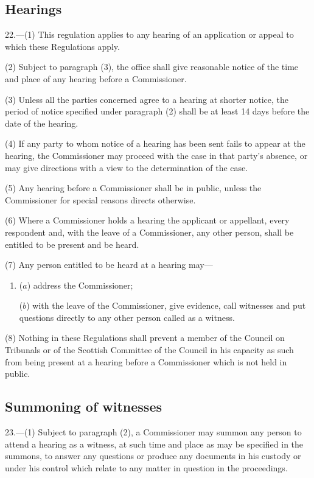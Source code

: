 \documentclass[12pt,a4paper]{article}
\begin{document}
\subsection[22. Hearings]{Hearings}

22.—(1) This regulation applies to any hearing of an application or appeal to which these Regulations apply.

(2) Subject to paragraph (3), the office shall give reasonable notice of the time and place of any hearing before a Commissioner.

(3) Unless all the parties concerned agree to a hearing at shorter notice, the period of notice specified under paragraph (2) shall be at least 14 days before the date of the hearing.

(4) If any party to whom notice of a hearing has been sent fails to appear at the hearing, the Commissioner may proceed with the case in that party’s absence, or may give directions with a view to the determination of the case.

(5) Any hearing before a Commissioner shall be in public, unless the Commissioner for special reasons directs otherwise.

(6) Where a Commissioner holds a hearing the applicant or appellant, every respondent and, with the leave of a Commissioner, any other person, shall be entitled to be present and be heard.

(7) Any person entitled to be heard at a hearing may---
\begin{enumerate}\item[]
($a$) address the Commissioner;

($b$) with the leave of the Commissioner, give evidence, call witnesses and put questions directly to any other person called as a witness.
\end{enumerate}

(8) Nothing in these Regulations shall prevent a member of the Council on Tribunals or of the Scottish Committee of the Council in his capacity as such from being present at a hearing before a Commissioner which is not held in public.

\subsection[23. Summoning of witnesses]{Summoning of witnesses}

23.—(1) Subject to paragraph (2), a Commissioner may summon any person to attend a hearing as a witness, at such time and place as may be specified in the summons, to answer any questions or produce any documents in his custody or under his control which relate to any matter in question in the proceedings.
\end{document}
